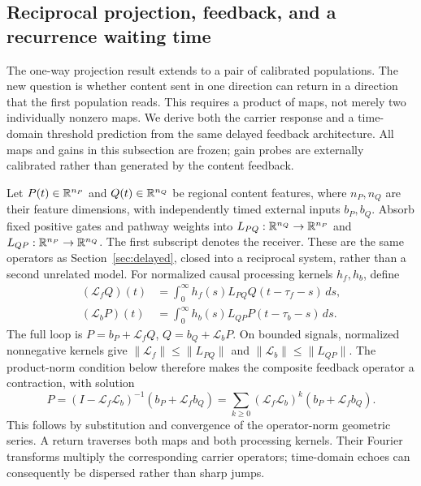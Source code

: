 \subsection{Reciprocal projection, feedback, and a recurrence waiting time}\label{sec:reciprocal}
The one-way projection result extends to a pair of calibrated populations. The new question is whether content sent in one direction can return in a direction that the first population reads. This requires a product of maps, not merely two individually nonzero maps. We derive both the carrier response and a time-domain threshold prediction from the same delayed feedback architecture. All maps and gains in this subsection are frozen; gain probes are externally calibrated rather than generated by the content feedback.

Let $P(t)\in\mathbb R^{n_P}$ and $Q(t)\in\mathbb R^{n_Q}$ be regional content features, where $n_P,n_Q$ are their feature dimensions, with independently timed external inputs $b_P,b_Q$. Absorb fixed positive gates and pathway weights into $L_{PQ}:\mathbb R^{n_Q}\to\mathbb R^{n_P}$ and $L_{QP}:\mathbb R^{n_P}\to\mathbb R^{n_Q}$. The first subscript denotes the receiver. These are the same operators as Section~\ref{sec:delayed}, closed into a reciprocal system, rather than a second unrelated model. For normalized causal processing kernels $h_f,h_b$, define
\begin{align}
(\mathcal L_f Q)(t)&=\int_0^\infty h_f(s)L_{PQ}Q(t-\tau_f-s)\,ds,\nonumber\\
(\mathcal L_b P)(t)&=\int_0^\infty h_b(s)L_{QP}P(t-\tau_b-s)\,ds.\label{eq:loop-operators}
\end{align}
The full loop is $P=b_P+\mathcal L_fQ$, $Q=b_Q+\mathcal L_bP$. On bounded signals, normalized nonnegative kernels give $\|\mathcal L_f\|\le\|L_{PQ}\|$ and $\|\mathcal L_b\|\le\|L_{QP}\|$. The product-norm condition below therefore makes the composite feedback operator a contraction, with solution
\[
P=(I-\mathcal L_f\mathcal L_b)^{-1}(b_P+\mathcal L_fb_Q)
=\sum_{k\ge0}(\mathcal L_f\mathcal L_b)^k(b_P+\mathcal L_fb_Q).
\]
This follows by substitution and convergence of the operator-norm geometric series. A return traverses both maps and both processing kernels. Their Fourier transforms multiply the corresponding carrier operators; time-domain echoes can consequently be dispersed rather than sharp jumps.

